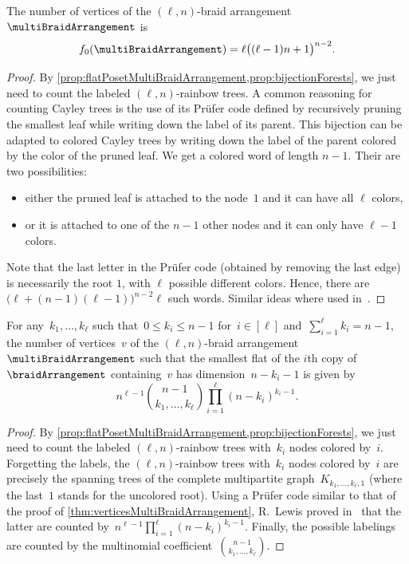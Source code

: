 \begin{theorem}
\label{thm:verticesMultiBraidArrangement}
The number of vertices of the $(\ell,n)$-braid arrangement~$\multiBraidArrangement$ is
\[
f_0(\multiBraidArrangement) = \ell \big( (\ell-1) n + 1 \big)^{n-2}.
\]
\end{theorem}

\begin{proof}
By \cref{prop:flatPosetMultiBraidArrangement,prop:bijectionForests}, we just need to count the labeled $(\ell,n)$-rainbow trees.
A common reasoning for counting Cayley trees is the use of its Prüfer code defined by recursively pruning the smallest leaf while writing down the label of its parent.
This bijection can be adapted to colored Cayley trees by writing down the label of the parent colored by the color of the pruned leaf.
We get a colored word of length $n-1$.
Their are two possibilities:
\begin{itemize}
\item either the pruned leaf is attached to the node~$1$ and it can have all $\ell$ colors,
\item or it is attached to one of the $n-1$ other nodes and it can only have $\ell-1$ colors.
\end{itemize}
Note that the last letter in the Prüfer code (obtained by removing the last edge) is necessarily the root $1$, with $\ell$ possible different colors.
Hence, there are $\big( \ell+(n-1)(\ell-1) \big)^{n-2} \ell$ such words.
Similar ideas where used in~\cite{Lewis}.
\end{proof}

\begin{theorem}
\label{thm:verticesRefinedMultiBraidArrangement}
For any~$k_1, \dots, k_\ell$ such that~$0 \le k_i \le n-1$ for~$i \in [\ell]$ and~${\sum_{i=1}^\ell k_i = n-1}$, the number of vertices~$v$ of the $(\ell,n)$-braid arrangement~$\multiBraidArrangement$ such that the smallest flat of the $i$th copy of~$\braidArrangement$ containing~$v$ has dimension~$n-k_i-1$ is given by
\[
n^{\ell-1} \binom{n-1}{k_1, \dots, k_\ell} \prod_{i=1}^\ell (n-k_i)^{k_i-1}.
\]
\end{theorem}

\begin{proof}
By \cref{prop:flatPosetMultiBraidArrangement,prop:bijectionForests}, we just need to count the labeled $(\ell,n)$-rainbow trees with~$k_i$ nodes colored by~$i$.
Forgetting the labels, the $(\ell,n)$-rainbow trees with~$k_i$ nodes colored by~$i$ are precisely the spanning trees of the complete multipartite graph~$K_{k_1, \dots, k_\ell, 1}$ (where the last~$1$ stands for the uncolored root).
Using a Pr\"ufer code similar to that of the proof of \cref{thm:verticesMultiBraidArrangement}, R.~Lewis proved in~\cite{Lewis} that the latter are counted by~${n^{\ell-1} \prod_{i=1}^\ell (n-k_i)^{k_i-1}}$.
Finally, the possible labelings are counted by the multinomial coefficient~$\binom{n-1}{k_1, \dots, k_\ell}$.
\end{proof}

